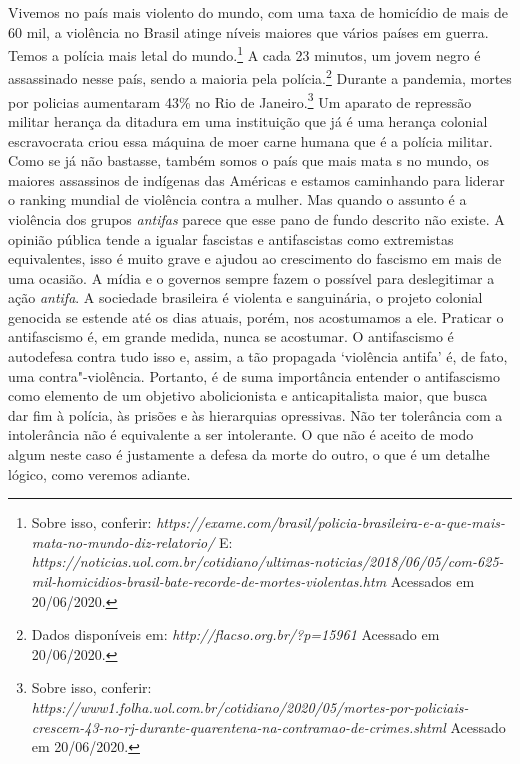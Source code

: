 Vivemos no país mais violento do mundo, com uma taxa de homicídio de
mais de 60 mil, a violência no Brasil atinge níveis maiores que vários
países em guerra. Temos a polícia mais letal do mundo.\footnote{Sobre
  isso, conferir:
  \emph{https://exame.com/brasil/policia-brasileira-e-a-que-mais-mata-no-mundo-diz-relatorio/}
  E:
  \emph{https://noticias.uol.com.br/cotidiano/ultimas-noticias/2018/06/05/com-625-mil-homicidios-brasil-bate-recorde-de-mortes-violentas.htm}
  Acessados em 20/06/2020.} A cada 23 minutos, um jovem negro é
assassinado nesse país, sendo a maioria pela polícia.\footnote{Dados
  disponíveis em:
  \emph{http://flacso.org.br/?p=15961}
  Acessado em 20/06/2020.} Durante a pandemia, mortes por policias
aumentaram 43\% no Rio de Janeiro.\footnote{Sobre isso, conferir:
  \emph{https://www1.folha.uol.com.br/cotidiano/2020/05/mortes-por-policiais-crescem-43-no-rj-durante-quarentena-na-contramao-de-crimes.shtml}
  Acessado em 20/06/2020.} Um aparato de repressão militar herança da
ditadura em uma instituição que já é uma herança colonial escravocrata
criou essa máquina de moer carne humana que é a polícia militar. Como se
já não bastasse, também somos o país que mais mata s no mundo, os
maiores assassinos de indígenas das Américas e estamos caminhando para
liderar o ranking mundial de violência contra a mulher. Mas quando o
assunto é a violência dos grupos \emph{antifas} parece que esse pano de
fundo descrito não existe. A opinião pública tende a igualar fascistas e
antifascistas como extremistas equivalentes, isso é muito grave e ajudou
ao crescimento do fascismo em mais de uma ocasião. A mídia e o governos
sempre fazem o possível para deslegitimar a ação \emph{antifa}. A
sociedade brasileira é violenta e sanguinária, o projeto colonial
genocida se estende até os dias atuais, porém, nos acostumamos a ele.
Praticar o antifascismo é, em grande medida, nunca se acostumar. O
antifascismo é autodefesa contra tudo isso e, assim, a tão propagada
`violência antifa' é, de fato, uma contra"-violência. Portanto, é de suma
importância entender o antifascismo como elemento de um objetivo
abolicionista e anticapitalista maior, que busca dar fim à polícia, às
prisões e às hierarquias opressivas. Não ter tolerância com a
intolerância não é equivalente a ser intolerante. O que não é aceito de
modo algum neste caso é justamente a defesa da morte do outro, o que é
um detalhe lógico, como veremos adiante.

